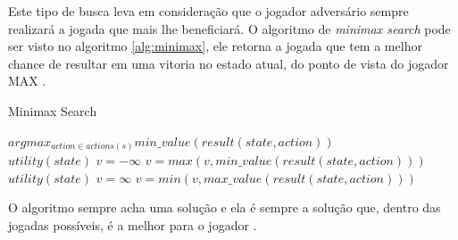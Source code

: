 Este tipo de busca leva em consideração que o jogador adversário sempre realizará a jogada que mais lhe beneficiará. 
O algoritmo de \textit{minimax search} pode ser visto no algoritmo \ref{alg:minimax}, ele retorna a jogada que tem a melhor chance de resultar em uma vitoria no estado atual, do ponto de vista do jogador MAX \cite{intelligence2003modern}. 

\begin{algorithm}
	\caption{Minimax Search}
	\label{alg:minimax}
	\begin{algorithmic}[]	
		\State \Return $arg max_{action \in actions(s)} min\_value(result(state, action)) $
		\EndFunction \\
		\State	\Return $utility(state)$
		\EndIf
		\State $v = -\infty$
		\State $v = max(v, min\_value(result(state,action)))$
		\EndFor	
		\EndFunction \\
		\State	\Return $utility(state)$
		\EndIf
		\State $v = \infty$
		\State $v = min(v, max\_value(result(state,action)))$
		\EndFor	
		\EndFunction
	\end{algorithmic}
\end{algorithm}

O algoritmo sempre acha uma solução e ela é sempre a solução que, dentro das jogadas possíveis, é a melhor para o jogador \cite{intelligence2003modern}.  

